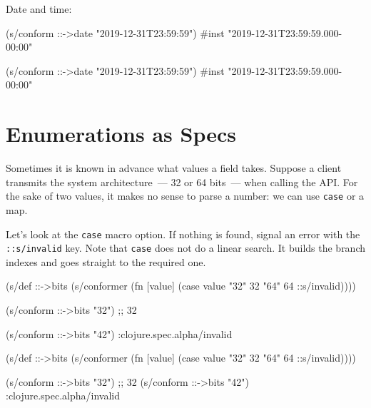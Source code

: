 \noindent
Date and time:

\ifx\DEVICETYPE\MOBILE

\begin{english}
  \begin{clojure}
(s/conform ::->date
           "2019-12-31T23:59:59")
#inst "2019-12-31T23:59:59.000-00:00"
  \end{clojure}
\end{english}

\else

\begin{english}
  \begin{clojure}
(s/conform ::->date "2019-12-31T23:59:59")
#inst "2019-12-31T23:59:59.000-00:00"
  \end{clojure}
\end{english}

\fi

\section{Enumerations as Specs}


Sometimes it is known in advance what values a field takes. Suppose a client transmits the system architecture~--- 32 or 64 bits~--- when calling the API. For the sake of two values, it makes no sense to parse a number: we can use \verb|case| or a map.

Let's look at the \verb|case| macro option. If nothing is found, signal an error with the \verb|::s/invalid| key. Note that \verb|case| does not do a linear search. It builds the branch indexes and goes straight to the required one.


\ifx\DEVICETYPE\MOBILE

\begin{english}
  \begin{clojure}
(s/def ::->bits
  (s/conformer
   (fn [value]
     (case value
       "32" 32 "64" 64
       ::s/invalid))))

(s/conform ::->bits "32") ;; 32

(s/conform ::->bits "42")
:clojure.spec.alpha/invalid
  \end{clojure}
\end{english}

\else

\begin{english}
  \begin{clojure}
(s/def ::->bits
  (s/conformer
   (fn [value]
     (case value
       "32" 32 "64" 64
       ::s/invalid))))

(s/conform ::->bits "32") ;; 32
(s/conform ::->bits "42") :clojure.spec.alpha/invalid
  \end{clojure}
\end{english}

